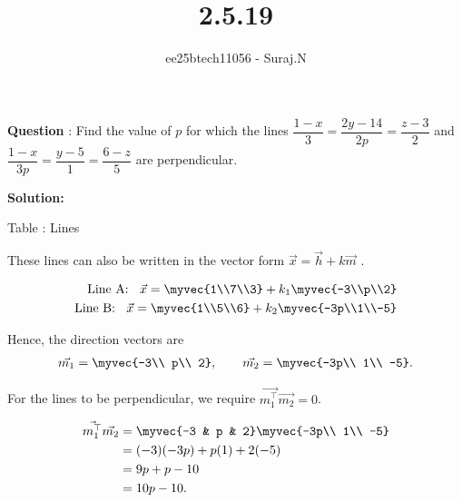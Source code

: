 \documentclass[journal,12pt,onecolumn]{IEEEtran}
\theoremstyle{remark}
\begin{document}
\title{2.5.19}
\author{ee25btech11056 - Suraj.N}
\maketitle
\renewcommand{\thefigure}{\theenumi}
\renewcommand{\thetable}{\theenumi}

\textbf{Question} : Find the value of $p$ for which the lines $\dfrac{1-x}{3}=\dfrac{2y-14}{2p}=\dfrac{z-3}{2}$ and $\dfrac{1-x}{3p}=\dfrac{y-5}{1}=\dfrac{6-z}{5}$ are perpendicular.

\textbf{Solution:}

\begin{table}[h!]
  \centering
  
  \caption*{Table : Lines}
  \label{2.5.19}
\end{table}


These lines can also be written in the vector form $\vec{x}=\vec{h}+k\vec{m}$ .

\begin{align*}
  \text{Line A: }\;\; \vec{x}=\myvec{1\\7\\3}+k_1\myvec{-3\\p\\2} \\
  \text{Line B: }\;\; \vec{x}=\myvec{1\\5\\6}+k_2\myvec{-3p\\1\\-5}
\end{align*}

Hence, the direction vectors are
\begin{align*}
  \vec{m_1}=\myvec{-3\\ p\\ 2}, \qquad
  \vec{m_2}=\myvec{-3p\\ 1\\ -5}.
\end{align*}

For the lines to be perpendicular, we require $\vec{m_1^\top} \vec{m_2}=0$.

\begin{align*}
  \vec{m_1^\top} \vec{m_2}
&= \myvec{-3 & p & 2}\myvec{-3p\\ 1\\ -5} \\
&= (-3)(-3p) + p(1) + 2(-5) \\
&= 9p + p - 10 \\
&= 10p - 10.
\end{align*}
\end{document}
